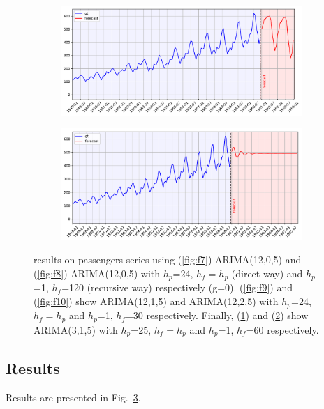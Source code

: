 \documentclass{article}
\begin{document}
\begin{figure}
  \begin{subfigure}{0.5\textwidth}
    \centering
    \includegraphics[scale=0.23]{figures/fig12}
    \caption{}
    \label{fig:f12}
  \end{subfigure}%
  \begin{subfigure}{0.5\textwidth}
    \centering
    \includegraphics[scale=0.23]{figures/fig11}
    \caption{}
    \label{fig:f11}
  \end{subfigure}


  \caption{results on passengers series using (\ref{fig:f7}) ARIMA(12,0,5) and (\ref{fig:f8}) ARIMA(12,0,5) with $h_p$=24, $h_f=h_p$ (direct way) and $h_p$=1, $h_f$=120 (recursive way) respectively (g=0). (\ref{fig:f9}) and (\ref{fig:f10}) show ARIMA(12,1,5) and ARIMA(12,2,5) with $h_p$=24, $h_f=h_p$ and $h_p$=1, $h_f$=30 respectively. Finally, (\ref{fig:f12}) and (\ref{fig:f11}) show ARIMA(3,1,5) with $h_p$=25, $h_f=h_p$ and $h_p$=1, $h_f$=60 respectively.}
  \label{fig:fig3}
\end{figure}


\subsection{Results}
Results are presented in Fig.~\ref{fig:fig3}.
\end{document}
